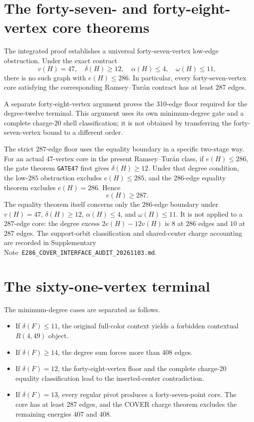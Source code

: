 \documentclass[11pt]{article}
\theoremstyle{definition}
\theoremstyle{remark}
\begin{document}
\section{The forty-seven- and forty-eight-vertex core theorems}
\label{sec:cores}

The integrated proof establishes a universal forty-seven-vertex low-edge
obstruction. Under the exact contract
\[
  v(H)=47,\quad \delta(H)\geq12,\quad
  \alpha(H)\leq4,\quad \omega(H)\leq11,
\]
there is no such graph with $e(H)\leq286$. In particular, every
forty-seven-vertex core satisfying the corresponding Ramsey--Tur\'an
contract has at least 287 edges.

A separate forty-eight-vertex argument proves the 310-edge floor required
for the degree-twelve terminal. This argument uses its own minimum-degree
gate and a complete charge-$20$ shell classification; it is not obtained
by transferring the forty-seven-vertex bound to a different order.

The strict $287$-edge floor uses the equality boundary in a
specific two-stage way. For an actual $47$-vertex core in the present
Ramsey--Tur\'an class, if $e(H)\leq286$, the gate theorem
\texttt{GATE47} first gives $\delta(H)\geq12$. Under that degree condition,
the low-$285$ obstruction excludes $e(H)\leq285$, and the
286-edge equality theorem excludes $e(H)=286$. Hence
\[
  e(H)\geq287.
\]
The equality theorem itself concerns only the $286$-edge boundary under
$v(H)=47$, $\delta(H)\geq12$, $\alpha(H)\leq4$, and
$\omega(H)\leq11$. It is not applied to a $287$-edge core: the degree
excess $2e(H)-12v(H)$ is $8$ at $286$ edges and $10$ at $287$ edges.
The support-orbit classification and shared-center charge accounting are
recorded in Supplementary Note~\texttt{E286\_COVER\_INTERFACE\_AUDIT\_20261103.md}.

\section{The sixty-one-vertex terminal}
\label{sec:terminal}

The minimum-degree cases are separated as follows.

\begin{itemize}
  \item If $\delta(F)\leq 11$, the original full-color context yields a
  forbidden contextual $R(4,49)$ object.
  \item If $\delta(F)\geq14$, the degree sum forces more than 408 edges.
  \item If $\delta(F)=12$, the forty-eight-vertex floor and the complete
  charge-$20$ equality classification lead to the inserted-center
  contradiction.
  \item If $\delta(F)=13$, every regular pivot produces a forty-seven-point
  core. The core has at least 287 edges, and the COVER charge theorem
  excludes the remaining energies 407 and 408.
\end{itemize}
\end{document}
